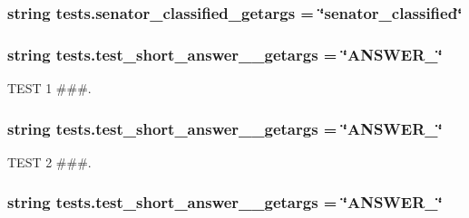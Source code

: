 \subsubsection[{senator\+\_\+classified\+\_\+getargs}]{\setlength{\rightskip}{0pt plus 5cm}string tests.\+senator\+\_\+classified\+\_\+getargs = \char`\"{}senator\+\_\+classified\char`\"{}}\label{namespacetests_a710ce4daf7bb272f672cf82c3a6ca91d}
\hypertarget{namespacetests_af46119fecedf02ffa994a83ae57872be}{}
\subsubsection[{test\+\_\+short\+\_\+answer\+\_\+1\+\_\+getargs}]{\setlength{\rightskip}{0pt plus 5cm}string tests.\+test\+\_\+short\+\_\+answer\+\_\+\_\+getargs = \char`\"{}A\+N\+S\+W\+E\+R\+\_\char`\"{}}\label{namespacetests_af46119fecedf02ffa994a83ae57872be}


T\+E\+S\+T 1 \#\#\#. 

\hypertarget{namespacetests_aa934e34b403fe9779aeea9c820d850a9}{}
\subsubsection[{test\+\_\+short\+\_\+answer\+\_\+2\+\_\+getargs}]{\setlength{\rightskip}{0pt plus 5cm}string tests.\+test\+\_\+short\+\_\+answer\+\_\+\_\+getargs = \char`\"{}A\+N\+S\+W\+E\+R\+\_\char`\"{}}\label{namespacetests_aa934e34b403fe9779aeea9c820d850a9}


T\+E\+S\+T 2 \#\#\#. 

\hypertarget{namespacetests_a44cb4e3dc58a9be2ee1cec3fdd4bcfd0}{}
\subsubsection[{test\+\_\+short\+\_\+answer\+\_\+3\+\_\+getargs}]{\setlength{\rightskip}{0pt plus 5cm}string tests.\+test\+\_\+short\+\_\+answer\+\_\+\_\+getargs = \char`\"{}A\+N\+S\+W\+E\+R\+\_\char`\"{}}\label{namespacetests_a44cb4e3dc58a9be2ee1cec3fdd4bcfd0}


